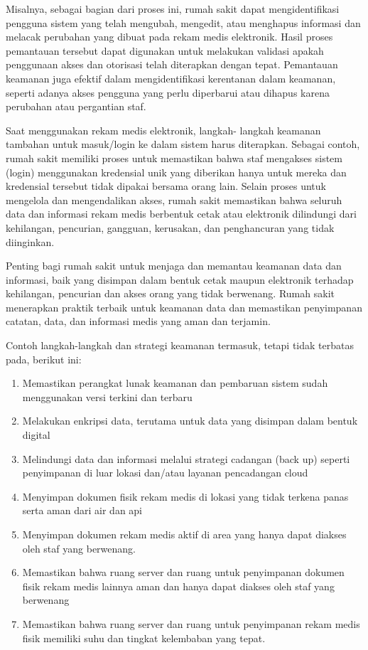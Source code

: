 \documentclass[
]{book}
\providecommand{\tightlist}{%
  \setlength{\itemsep}{0pt}\setlength{\parskip}{0pt}}
\begin{document}
Misalnya, sebagai bagian dari proses ini, rumah sakit dapat mengidentifikasi pengguna sistem yang telah mengubah,
mengedit, atau menghapus informasi dan melacak perubahan yang dibuat pada rekam medis elektronik. Hasil proses pemantauan tersebut dapat digunakan untuk melakukan validasi apakah penggunaan akses dan otorisasi telah diterapkan dengan tepat. Pemantauan keamanan juga efektif dalam mengidentifikasi kerentanan dalam keamanan, seperti adanya akses pengguna yang perlu diperbarui atau dihapus karena perubahan atau pergantian staf.

Saat menggunakan rekam medis elektronik, langkah- langkah keamanan tambahan untuk masuk/login ke dalam sistem harus diterapkan. Sebagai contoh, rumah sakit memiliki proses untuk memastikan bahwa staf mengakses sistem (login) menggunakan kredensial unik yang diberikan hanya untuk mereka dan kredensial tersebut tidak dipakai bersama orang lain. Selain proses untuk mengelola dan mengendalikan akses, rumah sakit memastikan bahwa seluruh data dan informasi rekam medis berbentuk cetak atau elektronik dilindungi dari kehilangan, pencurian, gangguan, kerusakan, dan penghancuran yang tidak diinginkan.

Penting bagi rumah sakit untuk menjaga dan memantau keamanan data dan informasi, baik yang disimpan dalam bentuk cetak maupun elektronik terhadap kehilangan, pencurian dan akses orang yang tidak berwenang. Rumah sakit menerapkan praktik terbaik untuk keamanan data dan memastikan penyimpanan catatan, data, dan informasi medis yang aman dan terjamin.

Contoh langkah-langkah dan strategi keamanan termasuk, tetapi tidak terbatas pada, berikut ini:

\begin{enumerate}
\def\labelenumi{\alph{enumi}.}
\tightlist
\item
  Memastikan perangkat lunak keamanan dan pembaruan sistem sudah menggunakan versi terkini dan terbaru
\item
  Melakukan enkripsi data, terutama untuk data yang disimpan dalam bentuk digital
\item
  Melindungi data dan informasi melalui strategi cadangan (back up) seperti penyimpanan di luar lokasi dan/atau layanan pencadangan cloud
\item
  Menyimpan dokumen fisik rekam medis di lokasi yang tidak terkena panas serta aman dari air dan api
\item
  Menyimpan dokumen rekam medis aktif di area yang hanya dapat diakses oleh staf yang berwenang.
\item
  Memastikan bahwa ruang server dan ruang untuk penyimpanan dokumen fisik rekam medis lainnya aman dan hanya dapat diakses oleh staf yang berwenang
\item
  Memastikan bahwa ruang server dan ruang untuk penyimpanan rekam medis fisik memiliki suhu dan tingkat kelembaban yang tepat.
\end{enumerate}
\end{document}
